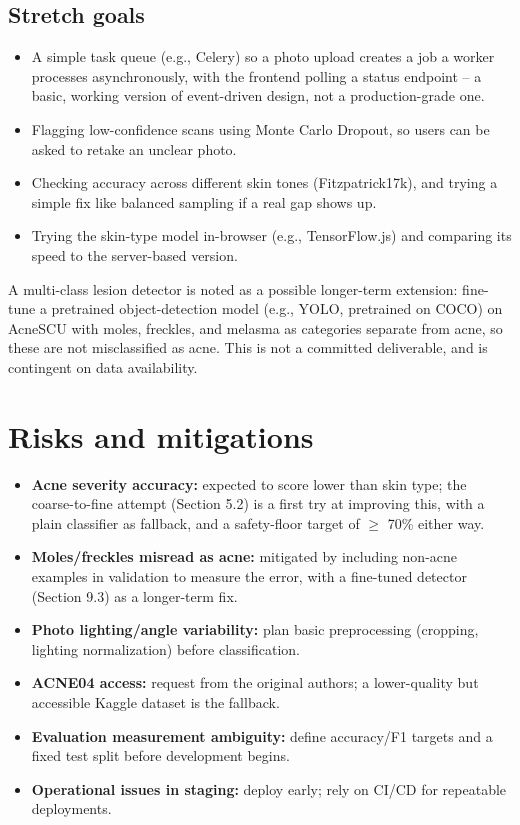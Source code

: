 \documentclass[11pt,a4paper]{article}
\begin{document}
\subsection{Stretch goals}
\begin{itemize}[leftmargin=0.7cm]
    \item A simple task queue (e.g., Celery) so a photo upload creates a job a worker processes asynchronously, with the frontend polling a status endpoint -- a basic, working version of event-driven design, not a production-grade one.
    \item Flagging low-confidence scans using Monte Carlo Dropout, so users can be asked to retake an unclear photo.
    \item Checking accuracy across different skin tones (Fitzpatrick17k), and trying a simple fix like balanced sampling if a real gap shows up.
    \item Trying the skin-type model in-browser (e.g., TensorFlow.js) and comparing its speed to the server-based version.
\end{itemize}
A multi-class lesion detector is noted as a possible
longer-term extension: fine-tune a pretrained
object-detection model (e.g., YOLO, pretrained on COCO)
on AcneSCU with moles, freckles, and melasma as
categories separate from acne, so these are not
misclassified as acne. This is not a committed
deliverable, and is contingent on data availability.

\section{Risks and mitigations}
\begin{itemize}[leftmargin=0.7cm]
    \item \textbf{Acne severity accuracy:} expected to score lower than skin type; the coarse-to-fine attempt (Section 5.2) is a first try at improving this, with a plain classifier as fallback, and a safety-floor target of $\geq$ 70\% either way.
    \item \textbf{Moles/freckles misread as acne:} mitigated by including non-acne examples in validation to measure the error, with a fine-tuned detector (Section 9.3) as a longer-term fix.
    \item \textbf{Photo lighting/angle variability:} plan basic preprocessing (cropping, lighting normalization) before classification.
    \item \textbf{ACNE04 access:} request from the original authors; a lower-quality but accessible Kaggle dataset is the fallback.
    \item \textbf{Evaluation measurement ambiguity:} define accuracy/F1 targets and a fixed test split before development begins.
    \item \textbf{Operational issues in staging:} deploy early; rely on CI/CD for repeatable deployments.
\end{itemize}
\end{document}
